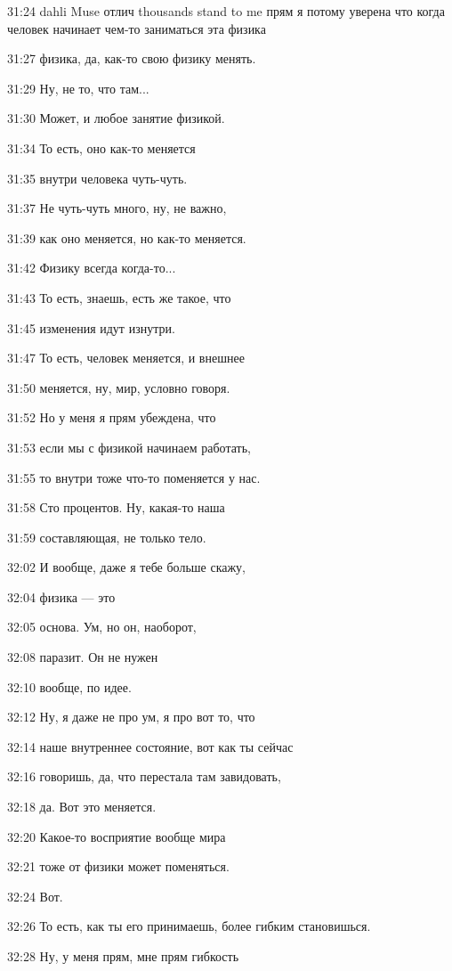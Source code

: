 31:24
dahli Muse отлич thousands stand to me прям я потому уверена что когда человек начинает чем-то заниматься эта физика

31:27
физика, да, как-то свою физику менять.

31:29
Ну, не то, что там...

31:30
Может, и любое занятие физикой.

31:34
То есть, оно как-то меняется

31:35
внутри человека чуть-чуть.

31:37
Не чуть-чуть много, ну, не важно,

31:39
как оно меняется, но как-то меняется.

31:42
Физику всегда когда-то...

31:43
То есть, знаешь, есть же такое, что

31:45
изменения идут изнутри.

31:47
То есть, человек меняется, и внешнее

31:50
меняется, ну, мир, условно говоря.

31:52
Но у меня я прям убеждена, что

31:53
если мы с физикой начинаем работать,

31:55
то внутри тоже что-то поменяется у нас.

31:58
Сто процентов. Ну, какая-то наша

31:59
составляющая, не только тело.

32:02
И вообще, даже я тебе больше скажу,

32:04
физика — это

32:05
основа. Ум, но он, наоборот,

32:08
паразит. Он не нужен

32:10
вообще, по идее.

32:12
Ну, я даже не про ум, я про вот то, что

32:14
наше внутреннее состояние, вот как ты сейчас

32:16
говоришь, да, что перестала там завидовать,

32:18
да. Вот это меняется.

32:20
Какое-то восприятие вообще мира

32:21
тоже от физики может поменяться.

32:24
Вот.

32:26
То есть, как ты его принимаешь, более гибким становишься.

32:28
Ну, у меня прям, мне прям гибкость

